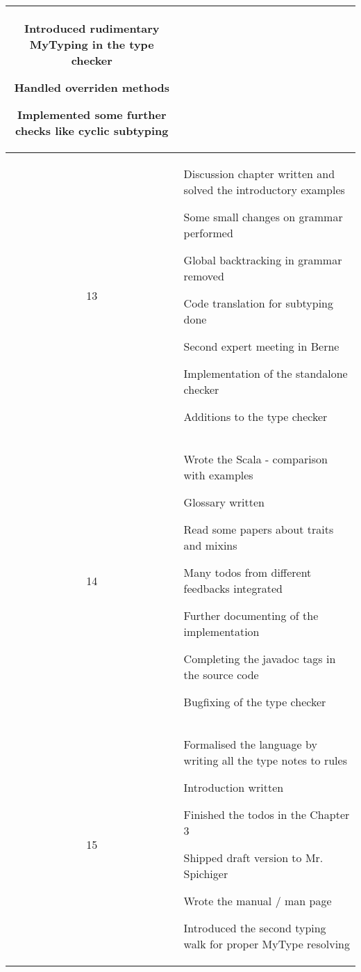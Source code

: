\begin{center}
\begin{longtable}{|c|p{12cm}|}
\begin{journal}
	\item Introduced rudimentary MyTyping in the type checker
	\item Handled overriden methods
	\item Implemented some further checks like cyclic subtyping
\end{journal}
\\ \hline
13 &
\begin{journal}
	\item Discussion chapter written and solved the introductory examples
	\item Some small changes on grammar performed
	\item Global backtracking in grammar removed
	\item Code translation for subtyping done
	\item Second expert meeting in Berne
	\item Implementation of the standalone checker
	\item Additions to the type checker
\end{journal}
\\ \hline
14 &
\begin{journal}
	\item Wrote the Scala - \ooplss comparison with examples
	\item Glossary written
	\item Read some papers about traits and mixins
	\item Many todos from different feedbacks integrated
	\item Further documenting of the implementation
	\item Completing the javadoc tags in the source code
	\item Bugfixing of the type checker
\end{journal}
\\ \hline
15 &
\begin{journal}
	\item Formalised the language by writing all the type notes to rules
	\item Introduction written
	\item Finished the todos in the Chapter 3
	\item Shipped draft version to Mr. Spichiger
	\item Wrote the manual / man page
	\item Introduced the second typing walk for proper MyType resolving
\end{journal}
\\ \hline

\end{longtable}
\end{center}
